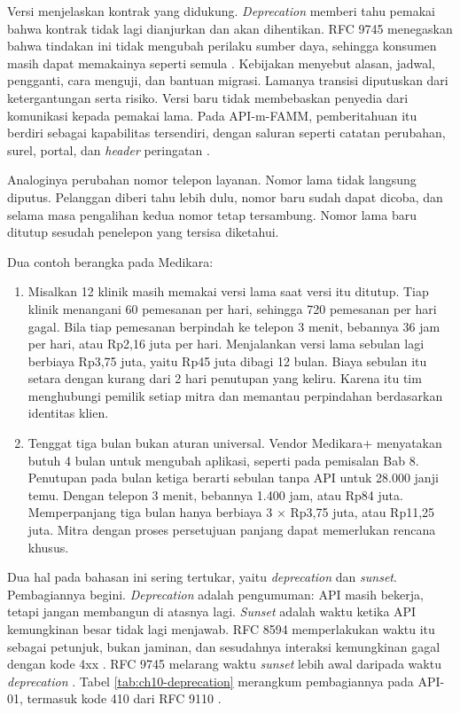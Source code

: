 Versi menjelaskan kontrak yang didukung. \textit{Deprecation} memberi tahu pemakai bahwa kontrak tidak lagi dianjurkan
dan akan dihentikan. RFC 9745 menegaskan bahwa tindakan ini tidak mengubah perilaku sumber daya, sehingga konsumen masih
dapat memakainya seperti semula \cite{c10-rfc9745}. Kebijakan menyebut alasan, jadwal, pengganti, cara menguji, dan
bantuan migrasi. Lamanya transisi diputuskan dari ketergantungan serta risiko. Versi baru tidak membebaskan penyedia
dari komunikasi kepada pemakai lama. Pada API-m-FAMM, pemberitahuan itu berdiri sebagai kapabilitas tersendiri, dengan
saluran seperti catatan perubahan, surel, portal, dan \textit{header} peringatan \cite{mathijssen2020}.

Analoginya perubahan nomor telepon layanan. Nomor lama tidak langsung diputus. Pelanggan diberi tahu lebih dulu, nomor
baru sudah dapat dicoba, dan selama masa pengalihan kedua nomor tetap tersambung. Nomor lama baru ditutup sesudah
penelepon yang tersisa diketahui.

Dua contoh berangka pada Medikara:
\begin{enumerate}
  \item Misalkan 12 klinik masih memakai versi lama saat versi itu ditutup. Tiap klinik menangani 60 pemesanan per hari,
        sehingga 720 pemesanan per hari gagal. Bila tiap pemesanan berpindah ke telepon 3 menit, bebannya 36 jam per
        hari, atau Rp2,16 juta per hari. Menjalankan versi lama sebulan lagi berbiaya Rp3,75 juta, yaitu Rp45 juta
        dibagi 12 bulan. Biaya sebulan itu setara dengan kurang dari 2 hari penutupan yang keliru. Karena itu tim
        menghubungi pemilik setiap mitra dan memantau perpindahan berdasarkan identitas klien.
  \item Tenggat tiga bulan bukan aturan universal. Vendor Medikara+ menyatakan butuh 4 bulan untuk mengubah aplikasi,
        seperti pada pemisalan Bab 8. Penutupan pada bulan ketiga berarti sebulan tanpa API untuk 28.000 janji temu.
        Dengan telepon 3 menit, bebannya 1.400 jam, atau Rp84 juta. Memperpanjang tiga bulan hanya berbiaya 3 $\times$
        Rp3,75 juta, atau Rp11,25 juta. Mitra dengan proses persetujuan panjang dapat memerlukan rencana khusus.
\end{enumerate}

Dua hal pada bahasan ini sering tertukar, yaitu \textit{deprecation} dan \textit{sunset}. Pembagiannya begini.
\textit{Deprecation} adalah pengumuman: API masih bekerja, tetapi jangan membangun di atasnya lagi. \textit{Sunset}
adalah waktu ketika API kemungkinan besar tidak lagi menjawab. RFC 8594 memperlakukan waktu itu sebagai petunjuk, bukan
jaminan, dan sesudahnya interaksi kemungkinan gagal dengan kode 4xx \cite{c10-rfc8594}. RFC 9745 melarang waktu
\textit{sunset} lebih awal daripada waktu \textit{deprecation} \cite{c10-rfc9745}. Tabel \ref{tab:ch10-deprecation}
merangkum pembagiannya pada API-01, termasuk kode 410 dari RFC 9110 \cite{rfc9110}.

